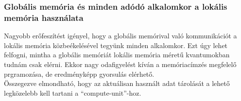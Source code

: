 		\subsubsection{Globális memória és minden adódó alkalomkor a lokális memória használata}
		Nagyobb erőfeszítést igényel, hogy a globális memórival való kommunikációt a
		lokális memória közbeékelésével tegyünk minden alkalomkor.
		Ezt úgy lehet felfogni, mintha a globális memóriát lokális memória méretű
		kvantumokban tudnám csak elérni.
		Ekkor nagy odafigyelést kíván a memóriacímzés megfelelő prgramozása, de
		eredményképp gyorsulás elérhető. \\
		
		Összegezve elmondható, hogy az aktuálisan használt adat tárolását a lehető
		legközelebb kell tartani a ``compute-unit''-hoz.
	
